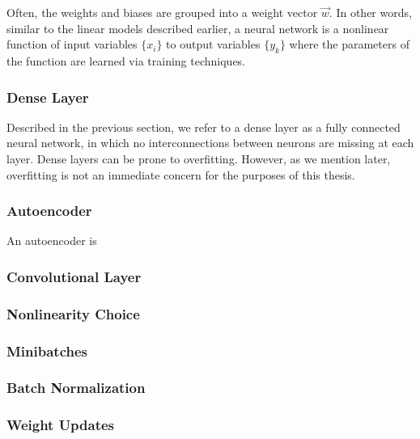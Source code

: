 Often, the weights and biases are grouped into a weight vector $\vec{w}$. In other words, similar to the linear models described earlier, a neural network is a nonlinear function of input variables $\{x_i\}$ to output variables $\{y_k\}$ where the parameters of the function are learned via training techniques.

\subsubsection{Dense Layer}

Described in the previous section, we refer to a dense layer as a fully connected neural network, in which no interconnections between neurons are missing at each layer. Dense layers can be prone to overfitting. However, as we mention later, overfitting is not an immediate concern for the purposes of this thesis.

\subsubsection{Autoencoder}

An autoencoder is

\subsubsection{Convolutional Layer}



\subsubsection{Nonlinearity Choice}



\subsubsection{Minibatches}



\subsubsection{Batch Normalization}



\subsubsection{Weight Updates}




